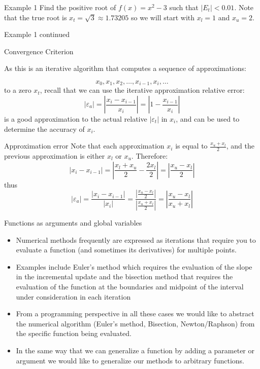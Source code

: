\documentclass[12pt]{beamer}
\begin{document}
\begin{frame}{Example 1}
\noindent
Find the positive root of $f(x)=x^2-3$ such that $|E_t|<0.01$. Note that the true root is $x_t=\sqrt{3} \approx 1.73205$ so we will start with $x_l=1$ and $x_u=2$.
\vspace{3 in}
\end{frame}

\begin{frame}{Example 1 continued}

\end{frame}

\begin{frame}{Convergence Criterion} 

As this is an iterative algorithm that computes a sequence of approximations: 

\[
x_0, x_1, x_2, \dots, x_{i-1}, x_i, \dots 
\] 
\noindent 
to a zero $x_t$, recall that we can use the iterative approximation relative 
error: 
\[
|\varepsilon_{a}| =  \left| \frac{x_i - x_{i-1}}{x_i}\right| = \left | 1 - \frac{x_{i-1}}{x_i} \right| 
\]
\noindent 
is a good approximation to the actual relative $|\varepsilon_t|$ in $x_i$, and can be used to determine the accuracy of $x_i$. 
\end{frame} 

\begin{frame}{Approximation error}
Note that each approximation $x_i$ is equal to $\frac{x_u + x_l}{2}$, and the previous approximation is either $x_l$ or $x_u$. Therefore: 
\[
|x_i - x_{i-1}| =\left|\frac{x_l+x_u}{2}-\frac{2x_l}{2}\right|= \left|\frac{x_u - x_l}{2} \right|
\] 
\noindent thus 
\[
|\varepsilon_a| = \frac{|x_i-x_{i-1}|}{|x_i|} =\frac{\left|\frac{x_u-x_l}{2}\right|}{\left| \frac{x_u + x_l}{2} \right|} = \left|\frac{x_u - x_l}{x_u + x_l}\right|
\] 
\end{frame} 


\begin{frame}{Functions as arguments and global variables} 

\begin{itemize}
\item{Numerical methods frequently are expressed as iterations that require
you to evaluate a function (and sometimes its derivatives) for multiple
points.} 
\item{Examples include Euler's method which requires the evaluation
of the slope in the incremental update and the bisection method that
requires the evaluation of the function at the boundaries and midpoint
of the interval under consideration in each iteration}
\item{From a programming perspective in all these
cases we would like to abstract the numerical algorithm (Euler's
method, Bisection, Newton/Raphson) from the specific function being
evaluated.}
\item{In the same way that we can generalize a function by adding
a parameter or argument we would like to generalize our methods to
arbitrary functions.}
\end{itemize}
\end{frame}
\end{document}
